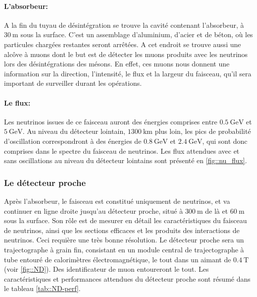             \paragraph{L'absorbeur:} A la fin du tuyau de désintégration se trouve la cavité contenant l'absorbeur, à $\SI{30}{\meter}$ sous la surface. C'est un assemblage d'aluminium, d'acier et de béton, où les particules chargées restantes seront arrêtées. A cet endroit se trouve aussi une alcôve à muons dont le but est de détecter les muons produits avec les neutrinos lors des désintégrations des mésons. En effet, ces muons nous donnent une information sur la direction, l'intensité, le flux et la largeur du faisceau, qu'il sera important de surveiller durant les opérations.
            
            \paragraph{Le flux:} Les neutrinos issues de ce faisceau auront des énergies comprises entre $\SI{0.5}{\giga\electronvolt}$ et $\SI{5}{\giga\electronvolt}$. Au niveau du détecteur lointain, $\SI{1300}{\kilo\meter}$ plus loin, les pics de probabilité d'oscillation correspondront à des énergies de $\SI{0.8}{\giga\electronvolt}$ et $\SI{2.4}{\giga\electronvolt}$, qui sont donc comprises dans le spectre du faisceau de neutrinos. Les flux attendues avec et sans oscillations au niveau du détecteur lointains sont présenté en \autoref{fig::nu_flux}.
            
            \subsubsection{Le détecteur proche}\label{sec::near_detector}
            Après l'absorbeur, le faisceau est constitué uniquement de neutrinos, et va continuer en ligne droite jusqu'au détecteur proche, situé à $\SI{300}{\meter}$ de là et $\SI{60}{\meter}$ sous la surface. Son rôle est de mesurer en détail les caractéristiques du faisceau de neutrinos, ainsi que les sections efficaces et les produits des interactions de neutrinos. Ceci requière une très bonne résolution. Le détecteur proche sera un trajectographe à grain fin, consistant en un module central de trajectographe à tube entouré de calorimètres électromagnétique, le tout dans un aimant de $\SI{0.4}{\tesla}$ (voir \autoref{fig::ND}). Des identificateur de muon entoureront le tout. Les caractéristiques et performances attendues du détecteur proche sont résumé dans le tableau \ref{tab::ND-perf}.
            
